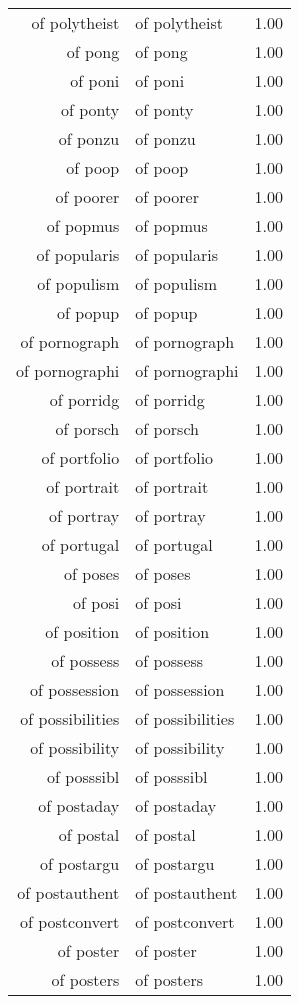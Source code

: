 \begin{table}[ht]
\begin{tabular}{rlr}
  of polytheist & of polytheist & 1.00 \\ 
  of pong & of pong & 1.00 \\ 
  of poni & of poni & 1.00 \\ 
  of ponty & of ponty & 1.00 \\ 
  of ponzu & of ponzu & 1.00 \\ 
  of poop & of poop & 1.00 \\ 
  of poorer & of poorer & 1.00 \\ 
  of popmus & of popmus & 1.00 \\ 
  of popularis & of popularis & 1.00 \\ 
  of populism & of populism & 1.00 \\ 
  of popup & of popup & 1.00 \\ 
  of pornograph & of pornograph & 1.00 \\ 
  of pornographi & of pornographi & 1.00 \\ 
  of porridg & of porridg & 1.00 \\ 
  of porsch & of porsch & 1.00 \\ 
  of portfolio & of portfolio & 1.00 \\ 
  of portrait & of portrait & 1.00 \\ 
  of portray & of portray & 1.00 \\ 
  of portugal & of portugal & 1.00 \\ 
  of poses & of poses & 1.00 \\ 
  of posi & of posi & 1.00 \\ 
  of position & of position & 1.00 \\ 
  of possess & of possess & 1.00 \\ 
  of possession & of possession & 1.00 \\ 
  of possibilities & of possibilities & 1.00 \\ 
  of possibility & of possibility & 1.00 \\ 
  of posssibl & of posssibl & 1.00 \\ 
  of postaday & of postaday & 1.00 \\ 
  of postal & of postal & 1.00 \\ 
  of postargu & of postargu & 1.00 \\ 
  of postauthent & of postauthent & 1.00 \\ 
  of postconvert & of postconvert & 1.00 \\ 
  of poster & of poster & 1.00 \\ 
  of posters & of posters & 1.00 \\ 

\end{tabular}
\end{table}

